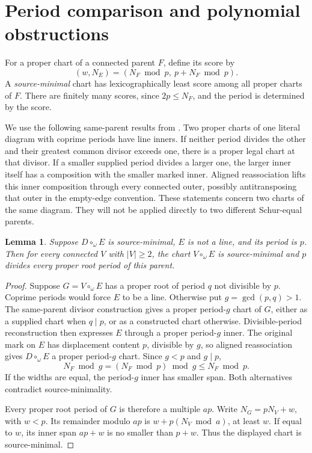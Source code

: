 \documentclass[11pt,a4paper]{amsart}
\numberwithin{equation}{section}
\theoremstyle{plain}
\newtheorem{lemma}[theorem]{Lemma}
\theoremstyle{definition}
\begin{document}
\section{Period comparison and polynomial obstructions}\label{sec:periods}

For a proper chart of a connected parent \(F\), define its score by
\begin{equation}\label{eq:score}
 (w,N_E)=(N_F\bmod p,\ p+N_F\bmod p).
\end{equation}
A \emph{source-minimal} chart has lexicographically least score among all proper charts of \(F\).  There are finitely many scores, since \(2p\le N_F\), and the period is determined by the score.

We use the following same-parent results from \cite{Shields2026Gluing}.  Two proper charts of one literal diagram with coprime periods have line inners.  If neither period divides the other and their greatest common divisor exceeds one, there is a proper legal chart at that divisor.  If a smaller supplied period divides a larger one, the larger inner itself has a composition with the smaller marked inner.  Aligned reassociation lifts this inner composition through every connected outer, possibly antitransposing that outer in the empty-edge convention.  These statements concern two charts of the same diagram.  They will not be applied directly to two different Schur-equal parents.

\begin{lemma}\label{lem:outer-independent}
Suppose \(D\circ_\omega E\) is source-minimal, \(E\) is not a line, and its period is \(p\).  Then for every connected \(V\) with \(|V|\ge2\), the chart \(V\circ_\omega E\) is source-minimal and \(p\) divides every proper root period of this parent.
\end{lemma}
\begin{proof}
Suppose \(G=V\circ_\omega E\) has a proper root of period \(q\) not divisible by \(p\).  Coprime periods would force \(E\) to be a line.  Otherwise put \(g=\gcd(p,q)>1\).  The same-parent divisor construction gives a proper period-\(g\) chart of \(G\), either as a supplied chart when \(q\mid p\), or as a constructed chart otherwise.  Divisible-period reconstruction then expresses \(E\) through a proper period-\(g\) inner.  The original mark on \(E\) has displacement content \(p\), divisible by \(g\), so aligned reassociation gives \(D\circ_\omega E\) a proper period-\(g\) chart.  Since \(g<p\) and \(g\mid p\),
\begin{equation*}
 N_F\bmod g=(N_F\bmod p)\bmod g\le N_F\bmod p.
\end{equation*}
If the widths are equal, the period-\(g\) inner has smaller span.  Both alternatives contradict source-minimality.

Every proper root period of \(G\) is therefore a multiple \(ap\).  Write \(N_G=pN_V+w\), with \(w<p\).  Its remainder modulo \(ap\) is \(w+p(N_V\bmod a)\), at least \(w\).  If equal to \(w\), its inner span \(ap+w\) is no smaller than \(p+w\).  Thus the displayed chart is source-minimal.
\end{proof}
\end{document}
